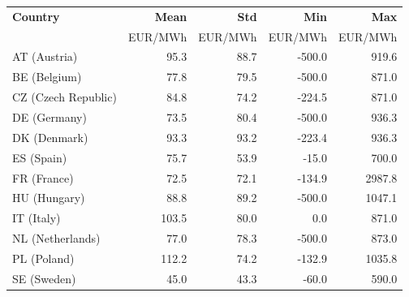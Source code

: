 \begin{tabular}{l r r r r}
\toprule
\textbf{Country} & \textbf{Mean} & \textbf{Std} & \textbf{Min} & \textbf{Max} \\
 & \scriptsize{EUR/MWh} & \scriptsize{EUR/MWh} & \scriptsize{EUR/MWh} & \scriptsize{EUR/MWh} \\
\midrule
AT (Austria) & 95.3 & 88.7 & -500.0 & 919.6 \\
BE (Belgium) & 77.8 & 79.5 & -500.0 & 871.0 \\
CZ (Czech Republic) & 84.8 & 74.2 & -224.5 & 871.0 \\
DE (Germany) & 73.5 & 80.4 & -500.0 & 936.3 \\
DK (Denmark) & 93.3 & 93.2 & -223.4 & 936.3 \\
ES (Spain) & 75.7 & 53.9 & -15.0 & 700.0 \\
FR (France) & 72.5 & 72.1 & -134.9 & 2987.8 \\
HU (Hungary) & 88.8 & 89.2 & -500.0 & 1047.1 \\
IT (Italy) & 103.5 & 80.0 & 0.0 & 871.0 \\
NL (Netherlands) & 77.0 & 78.3 & -500.0 & 873.0 \\
PL (Poland) & 112.2 & 74.2 & -132.9 & 1035.8 \\
SE (Sweden) & 45.0 & 43.3 & -60.0 & 590.0 \\
\bottomrule
\end{tabular}
